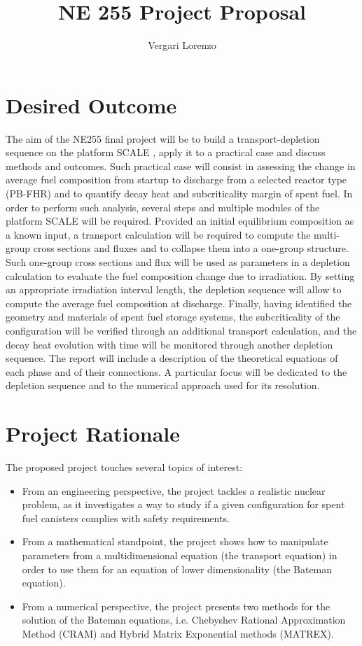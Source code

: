 \documentclass[a4paper]{article}
\title{NE 255 Project Proposal}
\author{Vergari Lorenzo}
\begin{document}
\maketitle

\section{Desired Outcome}
The aim of the NE255 final project will be to build a transport-depletion sequence on the platform SCALE \cite{Scale}, apply it to a practical case and discuss methods and outcomes. Such practical case will consist in assessing the change in average fuel composition from  startup to discharge from a selected reactor type (PB-FHR) and to quantify decay heat and subcriticality margin of spent fuel. In order to perform such analysis, several steps and multiple modules of the platform SCALE will be required. 
Provided an initial equilibrium composition as a known input, a transport calculation will be required to compute the multi-group cross sections and fluxes and to collapse them into a one-group structure. Such one-group cross sections and flux will be used as parameters in a depletion calculation to evaluate the fuel composition change due to irradiation. By setting an appropriate irradiation interval length, the depletion sequence will allow to compute the average fuel composition at discharge. Finally, having identified the geometry and materials of spent fuel storage systems, the subcriticality of the configuration will be verified through an additional transport calculation, and the decay heat evolution with time will be monitored through another depletion sequence.
The report will include a description of the theoretical equations of each phase and of their connections. A particular focus will be dedicated to the depletion sequence and to the numerical approach used for its resolution.

\section{Project Rationale}
The proposed project touches several topics of interest:
\begin{itemize}
    \item From an engineering perspective, the project tackles a realistic nuclear problem, as it investigates a way to study if a given configuration for spent fuel canisters complies with safety requirements.
    \item From a mathematical standpoint, the project shows how to manipulate parameters from a multidimensional equation (the transport equation) in order to use them for an equation of lower dimensionality (the Bateman equation).
    \item From a numerical perspective, the project presents two methods for the solution of the Bateman equations, i.e. Chebyshev Rational Approximation Method (CRAM) and Hybrid Matrix Exponential methods (MATREX).
\end{itemize}
\end{document}
